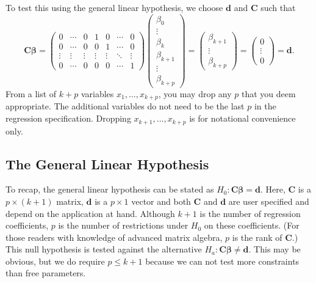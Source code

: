 To test this using the general linear hypothesis, we choose
$\mathbf{d}$ and $\mathbf{C}$ such that
\begin{equation*}
\mathbf{C\boldsymbol \beta =}\left(
\begin{array}{ccccccc}
0 & \cdots  & 0 & 1 & 0 & \cdots  & 0 \\
0 & \cdots  & 0 & 0 & 1 & \cdots  & 0 \\
\vdots  & \vdots  & \vdots  & \vdots  & \vdots  & \ddots  & \vdots  \\
0 & \cdots  & 0 & 0 & 0 & \cdots  & 1%
\end{array}%
\right) \left(
\begin{array}{c}
\beta_0 \\
\vdots  \\
\beta_k \\
\beta_{k+1} \\
\vdots  \\
\beta_{k+p}%
\end{array}%
\right) =\left(
\begin{array}{c}
\beta_{k+1} \\
\vdots  \\
\beta_{k+p}%
\end{array}%
\right) =\left(
\begin{array}{c}
0 \\
\vdots  \\
0
\end{array}%
\right) =\mathbf{d}.
\end{equation*}
From a list of $k+p$ variables $x_1, \ldots, x_{k+p}$, you may drop
any $p$ that you deem appropriate. The additional variables do not
need to be the last $p$ in the regression specification. Dropping
$x_{k+1}, \ldots, x_{k+p}$ is for notational convenience only.


\subsection{The General Linear Hypothesis}\label{S4:GenLinHypo}

To recap, the general linear hypothesis can be stated as
$H_0:\mathbf{C \boldsymbol \beta =d}$. Here, $\mathbf{C}$ is a $p
\times (k+1)$ matrix, $\mathbf{d}$ is a $p \times 1$ vector and both
$\mathbf{C}$ and $\mathbf{d}$ are user specified and depend on the
application at hand. Although $k+1$ is the number of regression
coefficients, $p$ is the number of restrictions under $H_0$ on these
coefficients. (For those readers with knowledge of advanced matrix
algebra, $p$ is the rank of $\mathbf{C}$.) This null hypothesis is
tested against the alternative $H_a:\mathbf{C \boldsymbol \beta \neq
d}$. This may be obvious, but we do require $p \leq k+1$ because we
can not test more constraints than free parameters.

